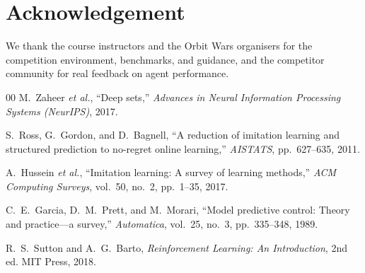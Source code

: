 \documentclass[conference]{IEEEtran}
\begin{document}
\section*{Acknowledgement}

We thank the course instructors and the Orbit Wars organisers for the competition environment, benchmarks, and guidance, and the competitor community for real feedback on agent performance.

\begin{thebibliography}{00}
M.~Zaheer \textit{et al.},
``Deep sets,''
\textit{Advances in Neural Information Processing Systems (NeurIPS)}, 2017.

S.~Ross, G.~Gordon, and D.~Bagnell,
``A reduction of imitation learning and structured prediction to no-regret online learning,''
\textit{AISTATS}, pp.~627--635, 2011.

A.~Hussein \textit{et al.},
``Imitation learning: A survey of learning methods,''
\textit{ACM Computing Surveys}, vol.~50, no.~2, pp.~1--35, 2017.

C.~E.~Garcia, D.~M.~Prett, and M.~Morari,
``Model predictive control: Theory and practice---a survey,''
\textit{Automatica}, vol.~25, no.~3, pp.~335--348, 1989.

R.~S.~Sutton and A.~G.~Barto,
\textit{Reinforcement Learning: An Introduction}, 2nd ed.
MIT Press, 2018.
\end{thebibliography}
\end{document}
